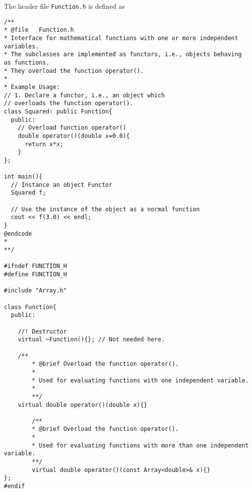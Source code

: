 The header file \lstinline{Function.h} is defined as 
\begin{lstlisting}[title={\url{http://folk.uio.no/mhjensen/compphys/programs/chapter05/cpp/Function.h}}]
/**
* @file   Function.h
* Interface for mathematical functions with one or more independent variables.
* The subclasses are implemented as functors, i.e., objects behaving as functions. 
* They overload the function operator().
*
* Example Usage:
// 1. Declare a functor, i.e., an object which 
// overloads the function operator().
class Squared: public Function{
  public:
    // Overload function operator()
    double operator()(double x=0.0){
      return x*x;
    }
};

int main(){
  // Instance an object Functor
  Squared f;

  // Use the instance of the object as a normal function
  cout << f(3.0) << endl;
}
@endcode
*
**/

#ifndef FUNCTION_H
#define FUNCTION_H

#include "Array.h"

class Function{
  public:
  
	//! Destructor
	virtual ~Function(){}; // Not needed here.
    
    /**
		* @brief Overload the function operator().
		*
		* Used for evaluating functions with one independent variable.
		*
		**/
    virtual double operator()(double x){}
		
		/**
		* @brief Overload the function operator().
		*
		* Used for evaluating functions with more than one independent variable.
		**/
		virtual double operator()(const Array<double>& x){}
};
#endif

\end{lstlisting}

